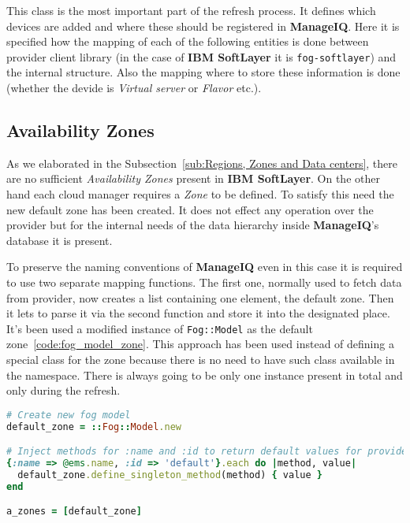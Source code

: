 This class is the most important part of the refresh process. It defines which devices are added and where these should be registered in \textbf{ManageIQ}. Here it is specified how the mapping of each of the following entities is done between provider client library (in the case of \textbf{IBM SoftLayer} it is \texttt{fog-softlayer}) and the internal structure. Also the mapping where to store these information is done (whether the devide is \emph{Virtual server} or \emph{Flavor} etc.).

\subsection{Availability Zones}
\label{sub:Availability Zones}

As we elaborated in the Subsection~\ref{sub:Regions, Zones and Data centers}, there are no sufficient \emph{Availability Zones} present in \textbf{IBM SoftLayer}. On the other hand each cloud manager requires a \emph{Zone} to be defined. To satisfy this need the new default zone has been created. It does not effect any operation over the provider but for the internal needs of the data hierarchy inside \textbf{ManageIQ}'s database it is present.

To preserve the naming conventions of \textbf{ManageIQ} even in this case it is required to use two separate mapping functions. The first one, normally used to fetch data from provider, now creates a list containing one element, the default zone. Then it lets to parse it via the second function and store it into the designated place. It's been used a modified instance of \texttt{Fog::Model} as the default zone~\ref{code:fog_model_zone}. This approach has been used instead of defining a special class for the zone because there is no need to have such class available in the namespace. There is always going to be only one instance present in total and only during the refresh.

\begin{lstlisting}[language=Ruby,caption={Declaration of the default \emph{Availability Zone}},label=code:fog_model_zone,float=htpb]
# Create new fog model
default_zone = ::Fog::Model.new

# Inject methods for :name and :id to return default values for provider
{:name => @ems.name, :id => 'default'}.each do |method, value|
  default_zone.define_singleton_method(method) { value }
end

a_zones = [default_zone]
\end{lstlisting}


